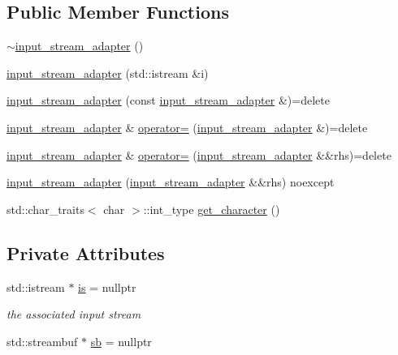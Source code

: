 \subsection*{Public Member Functions}
\begin{DoxyCompactItemize}
\item 
\hyperlink{classnlohmann_1_1detail_1_1input__stream__adapter_a1d29416acc75b02bfaf251d9d8ef8f36}{$\sim$input\+\_\+stream\+\_\+adapter} ()
\item 
\hyperlink{classnlohmann_1_1detail_1_1input__stream__adapter_af487152e4606d013eb4ec6a90eaf82ea}{input\+\_\+stream\+\_\+adapter} (std\+::istream \&i)
\item 
\hyperlink{classnlohmann_1_1detail_1_1input__stream__adapter_a5190fe4d0c5ff2e3b348b28ee3bb2218}{input\+\_\+stream\+\_\+adapter} (const \hyperlink{classnlohmann_1_1detail_1_1input__stream__adapter}{input\+\_\+stream\+\_\+adapter} \&)=delete
\item 
\hyperlink{classnlohmann_1_1detail_1_1input__stream__adapter}{input\+\_\+stream\+\_\+adapter} \& \hyperlink{classnlohmann_1_1detail_1_1input__stream__adapter_aeac5048221929b8f7558d1698dd0fb3a}{operator=} (\hyperlink{classnlohmann_1_1detail_1_1input__stream__adapter}{input\+\_\+stream\+\_\+adapter} \&)=delete
\item 
\hyperlink{classnlohmann_1_1detail_1_1input__stream__adapter}{input\+\_\+stream\+\_\+adapter} \& \hyperlink{classnlohmann_1_1detail_1_1input__stream__adapter_a088eead93cd71f1e3613d1876e3c95da}{operator=} (\hyperlink{classnlohmann_1_1detail_1_1input__stream__adapter}{input\+\_\+stream\+\_\+adapter} \&\&rhs)=delete
\item 
\hyperlink{classnlohmann_1_1detail_1_1input__stream__adapter_a0be44ef098e88e8453eb4c31c9b14421}{input\+\_\+stream\+\_\+adapter} (\hyperlink{classnlohmann_1_1detail_1_1input__stream__adapter}{input\+\_\+stream\+\_\+adapter} \&\&rhs) noexcept
\item 
std\+::char\+\_\+traits$<$ char $>$\+::int\+\_\+type \hyperlink{classnlohmann_1_1detail_1_1input__stream__adapter_ac6c760c5df3a85b5800b4271c09e8671}{get\+\_\+character} ()
\end{DoxyCompactItemize}
\subsection*{Private Attributes}
\begin{DoxyCompactItemize}
\item 
std\+::istream $\ast$ \hyperlink{classnlohmann_1_1detail_1_1input__stream__adapter_a55893bf84cb17d877464984942df9632}{is} = nullptr
\begin{DoxyCompactList}\small\item\em the associated input stream \end{DoxyCompactList}\item 
std\+::streambuf $\ast$ \hyperlink{classnlohmann_1_1detail_1_1input__stream__adapter_aa94582dc8262cf35dfcfbe7b7fcd6c6c}{sb} = nullptr
\end{DoxyCompactItemize}


